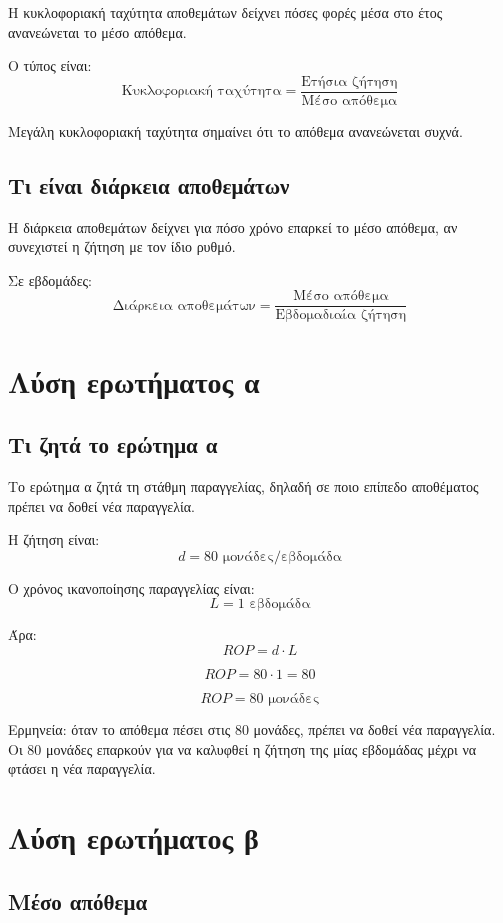 \documentclass[12pt,a4paper]{article}
\begin{document}
Η κυκλοφοριακή ταχύτητα αποθεμάτων δείχνει πόσες φορές μέσα στο έτος ανανεώνεται το μέσο απόθεμα.

Ο τύπος είναι:
\[
\text{Κυκλοφοριακή ταχύτητα}=
\frac{\text{Ετήσια ζήτηση}}{\text{Μέσο απόθεμα}}
\]

Μεγάλη κυκλοφοριακή ταχύτητα σημαίνει ότι το απόθεμα ανανεώνεται συχνά.

\subsection{Τι είναι διάρκεια αποθεμάτων}

Η διάρκεια αποθεμάτων δείχνει για πόσο χρόνο επαρκεί το μέσο απόθεμα, αν συνεχιστεί η ζήτηση με τον ίδιο ρυθμό.

Σε εβδομάδες:
\[
\text{Διάρκεια αποθεμάτων}=
\frac{\text{Μέσο απόθεμα}}{\text{Εβδομαδιαία ζήτηση}}
\]

\section{Λύση ερωτήματος α}

\subsection{Τι ζητά το ερώτημα α}

Το ερώτημα α ζητά τη στάθμη παραγγελίας, δηλαδή σε ποιο επίπεδο αποθέματος πρέπει να δοθεί νέα παραγγελία.

Η ζήτηση είναι:
\[
d=80 \text{ μονάδες/εβδομάδα}
\]

Ο χρόνος ικανοποίησης παραγγελίας είναι:
\[
L=1 \text{ εβδομάδα}
\]

Άρα:
\[
ROP=d\cdot L
\]

\[
ROP=80\cdot1=80
\]

\[
\boxed{ROP=80 \text{ μονάδες}}
\]

Ερμηνεία: όταν το απόθεμα πέσει στις 80 μονάδες, πρέπει να δοθεί νέα παραγγελία. Οι 80 μονάδες επαρκούν για να καλυφθεί η ζήτηση της μίας εβδομάδας μέχρι να φτάσει η νέα παραγγελία.

\section{Λύση ερωτήματος β}

\subsection{Μέσο απόθεμα}
\end{document}
